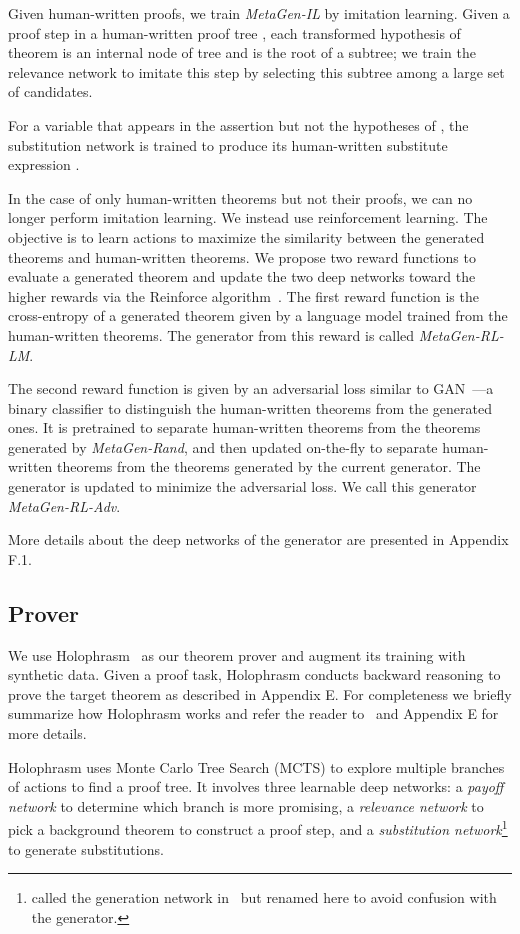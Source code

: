 \documentclass{article}
\begin{document}
Given human-written proofs,
we train \textit{MetaGen-IL} by imitation learning.
Given a proof step  in a human-written proof tree ,
each transformed hypothesis  of theorem 
 is an internal node of tree  and is the root of a subtree; we train the relevance network to imitate this step by selecting this subtree among a large set of candidates. 

For a variable  that appears in the assertion but not the hypotheses of , 
the substitution network is trained to produce 
its human-written substitute expression .

In the case of only human-written theorems but not their proofs, we can no longer perform imitation learning. We instead use reinforcement learning. The objective is to learn actions to maximize the similarity between the generated theorems and human-written theorems.  
We propose two reward functions to evaluate a generated theorem and  update the two deep networks 
toward the higher rewards via the Reinforce algorithm~\cite{williams1992simple}.
The first reward function is the cross-entropy of a generated theorem given by a language model trained from the human-written theorems. 
The generator from this reward is called \emph{MetaGen-RL-LM}.

The second reward function is given by an adversarial loss similar to GAN~\citep{goodfellow2014generative}---a binary classifier to distinguish the human-written theorems from the generated ones. 
It is pretrained to separate human-written theorems from the theorems generated by \emph{MetaGen-Rand},
and then updated on-the-fly to separate human-written theorems from the theorems 
generated by the current generator. The generator is updated to minimize the adversarial loss. 
We call this generator \emph{MetaGen-RL-Adv}.

More details about the deep networks of the generator are presented in Appendix F.1.

\subsection{Prover}
\label{sec:prover}
We use Holophrasm~\citep{whalen2016holophrasm} as our theorem prover and augment its training with synthetic data. 
Given a proof task,
Holophrasm conducts backward reasoning to prove the target theorem as described in Appendix E. For completeness we briefly summarize how Holophrasm works and refer the reader to~\citet{whalen2016holophrasm} and Appendix E for more details. 

Holophrasm uses Monte Carlo Tree Search (MCTS) to explore multiple branches of actions to find a proof tree.  It involves three learnable deep networks: a \emph{payoff network} to determine which branch is more promising, a \emph{relevance network} to pick a background theorem to construct a proof step, and a \emph{substitution network}\footnote{called the generation network in~\citet{whalen2016holophrasm} but renamed here  
to avoid confusion with the generator.} to generate substitutions.
\end{document}
